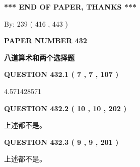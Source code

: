 \documentclass{ctexart}
\begin{document}
   
   
\vspace{1.0in} 
{\textbf{\large{ *** END OF PAPER, THANKS *** }}} 
   
   
\hspace{1.0in} By: 
 239 ( 416 ,  443 )
   
   
   
   
\newpage 
\setcounter{page}{ 
   432001 } 
   
   
   
   
 {\textbf{ \Large{ PAPER NUMBER  432  }}}
   
   
\vspace{0.2in}
   
   
   
   
   
   
 \vspace{0.2in}
{\LARGE {\textbf{ 八道算术和两个选择题}}}
   
   
  
\vspace{0.2in}
  
{\textbf{\Large{QUESTION
432.1 
 ( 7 , 7 , 107 )
}}}
  
  
 
 
\noindent{}

4.571428571
 
 
  
\vspace{0.2in}
  
{\textbf{\Large{QUESTION
432.2 
 ( 10 , 10 , 202 )
}}}
  
  
 
 
\noindent{}
 
 
 上述都不是。
 
 
 
 
  
\vspace{0.2in}
  
{\textbf{\Large{QUESTION
432.3 
 ( 9 , 9 , 201 )
}}}
  
  
 
 
\noindent{}
 
 
 上述都不是。
 
\end{document}
